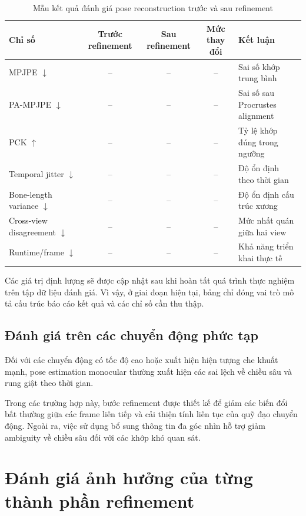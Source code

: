 \documentclass[../DoAn.tex]{subfiles}
\begin{document}
\begin{table}[H]
\centering
\caption{Mẫu kết quả đánh giá pose reconstruction trước và sau refinement}
\label{tab:refinement_result}
\begin{tabular}{|p{3.7cm}|c|c|c|p{3.0cm}|}
\hline
\textbf{Chỉ số} & \textbf{Trước refinement} & \textbf{Sau refinement} & \textbf{Mức thay đổi} & \textbf{Kết luận} \\
\hline
MPJPE $\downarrow$ & -- & -- & -- & Sai số khớp trung bình \\
\hline
PA-MPJPE $\downarrow$ & -- & -- & -- & Sai số sau Procrustes alignment \\
\hline
PCK $\uparrow$ & -- & -- & -- & Tỷ lệ khớp đúng trong ngưỡng \\
\hline
Temporal jitter $\downarrow$ & -- & -- & -- & Độ ổn định theo thời gian \\
\hline
Bone-length variance $\downarrow$ & -- & -- & -- & Độ ổn định cấu trúc xương \\
\hline
Cross-view disagreement $\downarrow$ & -- & -- & -- & Mức nhất quán giữa hai view \\
\hline
Runtime/frame $\downarrow$ & -- & -- & -- & Khả năng triển khai thực tế \\
\hline
\end{tabular}
\end{table}

Các giá trị định lượng sẽ được cập nhật sau khi hoàn tất quá trình thực nghiệm trên tập dữ liệu đánh giá. Vì vậy, ở giai đoạn hiện tại, bảng chỉ đóng vai trò mô tả cấu trúc báo cáo kết quả và các chỉ số cần thu thập.

\subsection{Đánh giá trên các chuyển động phức tạp}

Đối với các chuyển động có tốc độ cao hoặc xuất hiện hiện tượng che khuất mạnh, pose estimation monocular thường xuất hiện các sai lệch về chiều sâu và rung giật theo thời gian.

Trong các trường hợp này, bước refinement được thiết kế để giảm các biến đổi bất thường giữa các frame liên tiếp và cải thiện tính liên tục của quỹ đạo chuyển động. Ngoài ra, việc sử dụng bổ sung thông tin đa góc nhìn hỗ trợ giảm ambiguity về chiều sâu đối với các khớp khó quan sát.

\section{Đánh giá ảnh hưởng của từng thành phần refinement}
\end{document}
